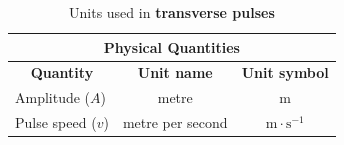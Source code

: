 
\begin{table}[H]
\begin{center}
\begin{tabular}{|l|c|c|}\hline \hline 
\multicolumn{3}{|c|}{\textbf{Physical Quantities}}\\ \hline \hline
\multicolumn{1}{|c|}{\textbf{Quantity}} & \textbf{Unit name} & \textbf{Unit symbol}\\ \hline
Amplitude ($A$) & metre & m \\ \hline
Pulse speed ($v$) & metre per second & $\text{m} \cdot \text{s}^{-1}$ \\ \hline
\end{tabular}
\end{center}
\caption{Units used in \textbf{transverse pulses} }
\label{table:electrostatics::units}
\end{table}

